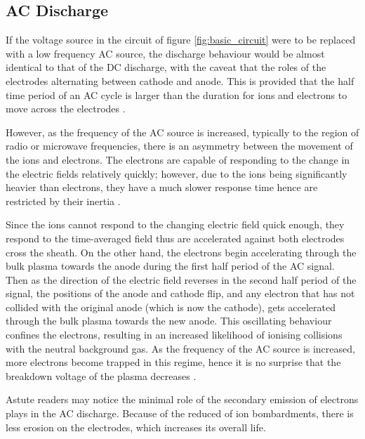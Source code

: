 \subsection{AC Discharge}

If the voltage source in the circuit of figure \ref{fig:basic_circuit} were to be replaced with a low frequency AC source, the discharge behaviour would be almost identical to that of the DC discharge, with the caveat that the roles of the electrodes alternating between cathode and anode. This is provided that the half time period of an AC cycle is larger than the duration for ions and electrons to move across the electrodes \cite{Bogaerts2002}.

However, as the frequency of the AC source is increased, typically to the region of radio or microwave frequencies, there is an asymmetry between the movement of the ions and electrons. The electrons are capable of responding to the change in the electric fields relatively quickly; however, due to the ions being significantly heavier than electrons, they have a much slower response time hence are restricted by their inertia \cite{Chabert2011}.

Since the ions cannot respond to the changing electric field quick enough, they respond to the time-averaged field thus are accelerated against both electrodes cross the sheath. On the other hand, the electrons begin accelerating through the bulk plasma towards the anode during the first half period of the AC signal. Then as the direction of the electric field reverses in the second half period of the signal, the positions of the anode and cathode flip, and any electron that has not collided with the original anode (which is now the cathode), gets accelerated through the bulk plasma towards the new anode. This oscillating behaviour confines the electrons, resulting in an increased likelihood of ionising collisions with the neutral background gas. As the frequency of the AC source is increased, more electrons become trapped in this regime, hence it is no surprise that the breakdown voltage of the plasma decreases \cite{Chu1992}.

Astute readers may notice the minimal role of the secondary emission of electrons plays in the AC discharge. Because of the reduced of ion bombardments, there is less erosion on the electrodes, which increases its overall life. 


